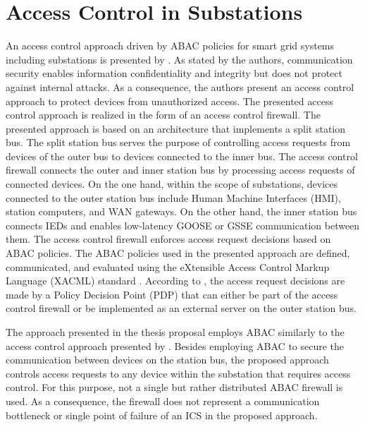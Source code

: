 \section{Access Control in Substations}
An access control approach driven by ABAC policies for smart grid systems including substations is presented by \citeauthor{Ruland2018} \cite{Ruland2018}.
As stated by the authors, communication security enables information confidentiality and integrity but does not protect against internal attacks.
As a consequence, the authors present an access control approach to protect devices from unauthorized access.
The presented access control approach is realized in the form of an access control firewall.
The presented approach is based on an architecture that implements a split station bus.
The split station bus serves the purpose of controlling access requests from devices of the outer bus to devices connected to the inner bus.
The access control firewall connects the outer and inner station bus by processing access requests of connected devices.
On the one hand, within the scope of substations, devices connected to the outer station bus include Human Machine Interfaces (HMI), station computers, and WAN gateways.
On the other hand, the inner station bus connects IEDs and enables low-latency GOOSE or GSSE communication between them.
The access control firewall enforces access request decisions based on ABAC policies.
The ABAC policies used in the presented approach are defined, communicated, and evaluated using the eXtensible Access Control Markup Language (XACML) standard \cite{Oasis2013}.
According to \citeauthor{Ruland2018}, the access request decisions are made by a Policy Decision Point (PDP) that can either be part of the access control firewall or be implemented as an external server on the outer station bus.

The approach presented in the thesis proposal employs ABAC similarly to the access control approach presented by \citeauthor{Ruland2018}.
Besides employing ABAC to secure the communication between devices on the station bus, the proposed approach controls access requests to any device within the substation that requires access control. 
For this purpose, not a single but rather distributed ABAC firewall is used.
As a consequence, the firewall does not represent a communication bottleneck or single point of failure of an ICS in the proposed approach.

